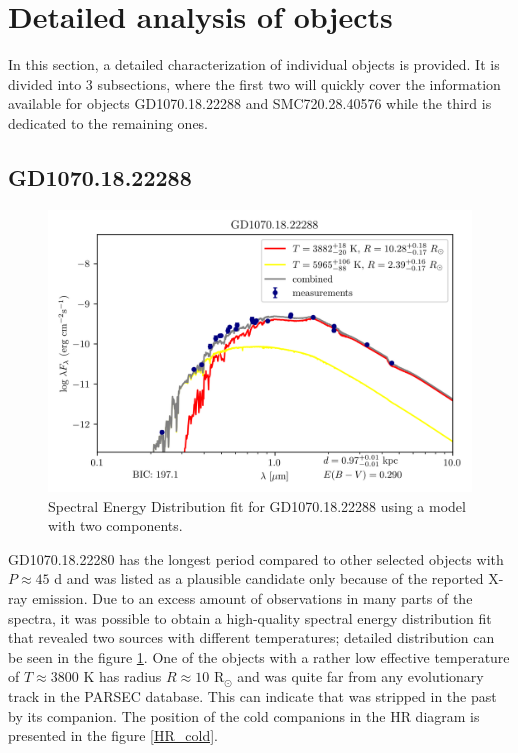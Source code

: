 \documentclass{pracalicmgr}
\begin{document}
\section{Detailed analysis of objects}
In this section, a detailed characterization of individual objects is provided. It is divided into $3$ subsections, where the first two will quickly cover the information
available for objects GD1070.18.22288 and SMC720.28.40576 while the third is dedicated to the remaining ones.
\subsection{GD1070.18.22288}
\begin{figure}[H]
    \includegraphics{plots/GD1070.18.22288/GD1070.18.22288_double_emcee.png}
    \caption{Spectral Energy Distribution fit for GD1070.18.22288 using a model with two components.}\label{GD1070SED}
\end{figure}
GD1070.18.22280 has the longest period compared to other selected objects with $P\approx 45$ d and was listed as a plausible candidate only because of the reported X-ray emission.
Due to an excess amount of observations in many parts of the spectra, it was possible to obtain a high-quality spectral energy distribution fit that revealed two sources with different temperatures;
detailed distribution can be seen in the figure \ref{GD1070SED}.
One of the objects with a rather low effective temperature of
$T\approx 3800$ K has radius $R\approx 10$ $\textrm{R}_{\odot}$ and was quite far from any evolutionary track in the PARSEC database. This can indicate
that was stripped in the past by its companion.
The position of the cold companions in the HR diagram is presented in the figure \ref{HR_cold}.
\end{document}
